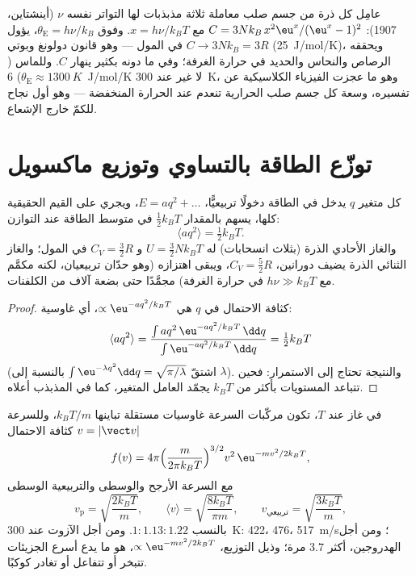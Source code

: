 \begin{example}\label{ex:b2:boltzmann-factor:einstein}
عامِل كل ذرة من جسم صلب معاملة ثلاثة مذبذبات لها التواتر نفسه
$\nu$ (أينشتاين، 1907): $C = 3Nk_B\,x^2\eu^x/(\eu^x - 1)^2$ مع $x =
h\nu/k_BT$. وفوق $\theta_{\text{E}} = h\nu/k_B$، يؤول $C \to 3Nk_B = 3R$ في المول
--- وهو قانون دولونغ وبوتي (\qty{25}{J/mol/K})، ويحققه الرصاص
والنحاس والحديد في حرارة الغرفة؛ وفي ما دونه بكثير ينهار $C$. وللماس
($\theta_{\text{E}} \approx \qty{1300}{K}$) \qty{6}{J/mol/K} لا غير عند
\qty{300}{K}، وهو ما عجزت الفيزياء الكلاسيكية عن تفسيره، وسعة كل جسم صلب
الحرارية تنعدم عند الحرارة المنخفضة --- وهو أول نجاح للكمّ خارج الإشعاع.
\end{example}

\section{توزّع الطاقة بالتساوي وتوزيع ماكسويل}

\begin{theorem}\label{thm:b2:boltzmann-factor:equipartition}
كل متغير $q$ يدخل في الطاقة دخولًا تربيعيًّا، $E = aq^2 +
\dots$، ويجري على القيم الحقيقية كلها، يسهم بالمقدار $\tfrac12k_BT$ في
متوسط الطاقة عند التوازن:
\[
\langle aq^2\rangle = \tfrac12k_BT .
\]
والغاز الأحادي الذرة (بثلاث انسحابات) له $U = \tfrac32Nk_BT$ و $C_V =
\tfrac32R$ في المول؛ والغاز الثنائي الذرة يضيف دورانين، $C_V = \tfrac52R$،
ويبقى اهتزازه (وهو حدّان تربيعيان، لكنه مكمَّم مع $h\nu \gg
k_BT$ في حرارة الغرفة) مجمَّدًا حتى بضعة آلاف من الكلفنات.
\end{theorem}

\begin{proof}
كثافة الاحتمال في $q$ هي $\propto\eu^{-aq^2/k_BT}$، أي غاوسية:
\[
\langle aq^2\rangle = \frac{\int aq^2\,\eu^{-aq^2/k_BT}\,\dd q}{\int\eu^{-aq^2/k_BT}\,\dd q} = \tfrac12k_BT
\]
(اشتقّ $\int\eu^{-\lambda q^2}\dd q = \sqrt{\pi/\lambda}$ بالنسبة إلى
$\lambda$). والنتيجة تحتاج إلى الاستمرار: فحين تتباعد
المستويات بأكثر من $k_BT$ يجمّد العامل المتغير،
كما في المذبذب أعلاه.
\end{proof}

\begin{theorem}\label{thm:b2:boltzmann-factor:maxwell}
في غاز عند $T$، تكون مركّبات السرعة غاوسيات مستقلة
تباينها $k_BT/m$، وللسرعة $v = |\vect v|$ كثافة
الاحتمال
\[
f(v) = 4\pi\Big(\frac{m}{2\pi k_BT}\Big)^{3/2}v^2\,\eu^{-mv^2/2k_BT} ,
\]
مع السرعة الأرجح والوسطى والتربيعية الوسطى
\[
v_{\text{p}} = \sqrt{\frac{2k_BT}{m}}, \qquad
\langle v\rangle = \sqrt{\frac{8k_BT}{\pi m}}, \qquad
v_{\text{تربيعي}} = \sqrt{\frac{3k_BT}{m}} ,
\]
بالنسب $1 : 1.13 : 1.22$. ومن أجل الآزوت عند \qty{300}{K}: \qty{422}{}،
\qty{476}{}، \qty{517}{m/s}؛ ومن أجل الهدروجين، أكثر $3.7$ مرة؛ وذيل
التوزيع، $\propto\eu^{-mv^2/2k_BT}$، هو ما يدع أسرع
الجزيئات تتبخر أو تتفاعل أو تغادر كوكبًا.
\end{theorem}

